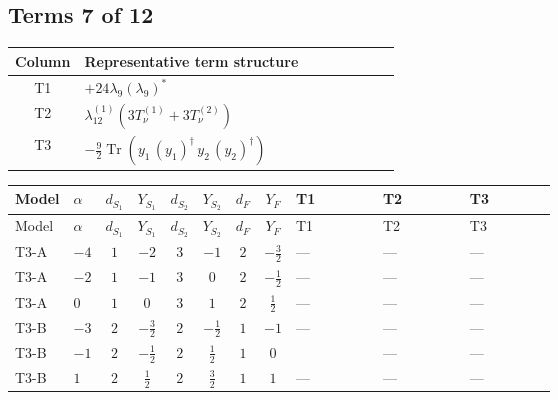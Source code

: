 \documentclass[8pt]{article}
\begin{document}
\begin{landscape}
\subsection*{Terms 7 of 12}
\begin{center}
\begin{tabular}{@{}c >{\raggedright\arraybackslash}p{0.82\linewidth}@{}}
\toprule
Column & Representative term structure \\
\midrule
T1 & \(\displaystyle +24 {\lambda_{9}} \left({\lambda_{9}}\right)^{*}\) \\
\midrule
T2 & \(\displaystyle {\lambda_{12}^{(1)}} (3 T_{\nu}^{(1)}+3 T_{\nu}^{(2)})\) \\
\midrule
T3 & \(\displaystyle -\frac{9}{2} \operatorname{Tr}\!\left({y_1}\,\left({y_1}\right)^{\dagger}\,{y_2}\,\left({y_2}\right)^{\dagger}\right)\) \\
\midrule
\bottomrule
\end{tabular}
\end{center}
\smallskip
\tiny
\begin{longtable}{@{}llcccccc >{\raggedright\arraybackslash}p{0.21\linewidth} >{\raggedright\arraybackslash}p{0.21\linewidth} >{\raggedright\arraybackslash}p{0.21\linewidth}@{}}
\toprule
Model & $\alpha$ & $d_{S_1}$ & $Y_{S_1}$ & $d_{S_2}$ & $Y_{S_2}$ & $d_F$ & $Y_F$ & T1 & T2 & T3 \\
\midrule
\endfirsthead
\toprule
Model & $\alpha$ & $d_{S_1}$ & $Y_{S_1}$ & $d_{S_2}$ & $Y_{S_2}$ & $d_F$ & $Y_F$ & T1 & T2 & T3 \\
\midrule
\endhead
T3-A & $-4$ & $1$ & $-2$ & $3$ & $-1$ & $2$ & $-\frac{3}{2}$ & --- & --- & --- \\
\midrule
T3-A & $-2$ & $1$ & $-1$ & $3$ & $0$ & $2$ & $-\frac{1}{2}$ & --- & --- & --- \\
\midrule
T3-A & $0$ & $1$ & $0$ & $3$ & $1$ & $2$ & $\frac{1}{2}$ & --- & --- & --- \\
\midrule
T3-B & $-3$ & $2$ & $-\frac{3}{2}$ & $2$ & $-\frac{1}{2}$ & $1$ & $-1$ & --- & --- & --- \\
\midrule
T3-B & $-1$ & $2$ & $-\frac{1}{2}$ & $2$ & $\frac{1}{2}$ & $1$ & $0$ & \scriptsize\adjustbox{max width=\linewidth}{$\begin{gathered} +24 {\lambda_{9}} \left({\lambda_{9}}\right)^{*}\end{gathered}$} & --- & --- \\
\midrule
T3-B & $1$ & $2$ & $\frac{1}{2}$ & $2$ & $\frac{3}{2}$ & $1$ & $1$ & --- & --- & --- \\
\midrule

\end{longtable}
\end{landscape}
\end{document}
